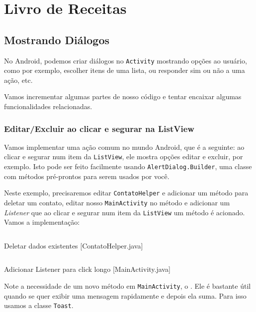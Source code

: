 \chapter{Livro de Receitas}

\section{Mostrando Diálogos}

No Android, podemos criar diálogos no \texttt{Activity} mostrando opções ao usuário, como por exemplo,
escolher itens de uma lista, ou responder sim ou não a uma ação, etc.

Vamos incrementar algumas partes de nosso código e tentar encaixar algumas funcionalidades
relacionadas.

\subsection{Editar/Excluir ao clicar e segurar na ListView}

Vamos implementar uma ação comum no mundo Android, que é a seguinte: ao clicar e segurar num item
da \texttt{ListView}, ele mostra opções editar e excluir, por exemplo. Isto pode ser
feito facilmente usando \texttt{AlertDialog.Builder}, uma classe com métodos pré-prontos
para serem usados por você.

Neste exemplo, precisaremos editar \texttt{ContatoHelper} e adicionar um método para
deletar um contato, editar nosso \texttt{MainActivity} no método 
e adicionar um \textit{Listener} que ao clicar e segurar num item da \texttt{ListView}
um método é acionado. Vamos a implementação:

\begin{listing}[H]
  \inputminted[linenos=true,frame=bottomline,tabsize=3]{ java }{ source/ContatoHelper-5.java }
  \caption{Deletar dados existentes [ContatoHelper.java]}
\end{listing}

\begin{listing}[H]
  \inputminted[linenos=true,frame=bottomline,tabsize=3]{ java }{ source/MainActivity-8.java }
  \caption{Adicionar Listener para click longo [MainActivity.java]}
\end{listing}

Note a necessidade de um novo método em \texttt{MainActivity}, o .
Ele é bastante útil quando se quer exibir uma mensagem rapidamente e depois ela suma.
Para isso usamos a classe \texttt{Toast}.

